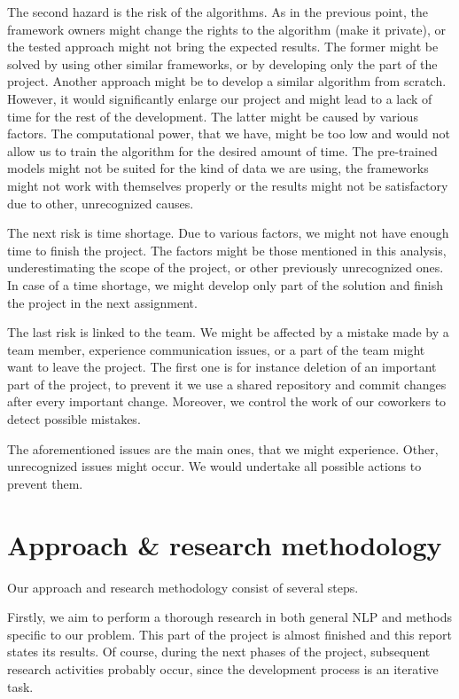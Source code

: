 \documentclass[11pt]{article}
\begin{document}
The second hazard is the risk of the algorithms. As in the previous point, the framework owners might change the rights to the algorithm (make it private), or the tested approach might not bring the expected results. The former might be solved by using other similar frameworks, or by developing only the part of the project. Another approach might be to develop a similar algorithm from scratch. However, it would significantly enlarge our project and might lead to a lack of time for the rest of the development. The latter might be caused by various factors. The computational power, that we have, might be too low and would not allow us to train the algorithm for the desired amount of time. The pre-trained models might not be suited for the kind of data we are using, the frameworks might not work with themselves properly or the results might not be satisfactory due to other, unrecognized causes. 

The next risk is time shortage. Due to various factors, we might not have enough time to finish the project. The factors might be those mentioned in this analysis, underestimating the scope of the project, or other previously unrecognized ones. In case of a time shortage, we might develop only part of the solution and finish the project in the next assignment. 

The last risk is linked to the team. We might be affected by a mistake made by a team member, experience communication issues, or a part of the team might want to leave the project. The first one is for instance deletion of an important part of the project, to prevent it we use a shared repository and commit changes after every important change. Moreover, we control the work of our coworkers to detect possible mistakes. 

The aforementioned issues are the main ones, that we might experience. Other, unrecognized issues might occur. We would undertake all possible actions to prevent them.

\section{Approach \& research methodology}

Our approach and research methodology consist of several steps. 

Firstly, we aim to perform a thorough research in both general NLP and methods specific to our problem. This part of the project is almost finished and this report states its results. Of course, during the next phases of the project, subsequent research activities probably occur, since the development process is an iterative task. 
\end{document}
